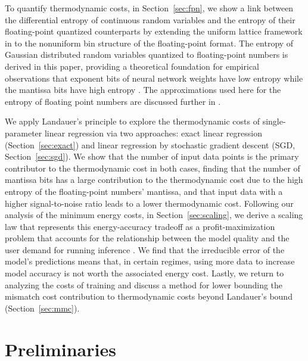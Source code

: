 \documentclass[12pt,onecolumn, margin=1in]{IEEEtran}
\begin{document}
To quantify thermodynamic costs, in Section~\ref{sec:fpn}, we show a link between the differential entropy of continuous random variables and the entropy of their floating-point quantized counterparts by extending the uniform lattice framework in \cite{kostina_data_2017} to the nonuniform bin structure of the floating-point format. 
The entropy of Gaussian distributed random variables quantized to floating-point numbers is derived in this paper, providing a theoretical foundation for empirical observations that exponent bits of neural network weights have low entropy while the mantissa bits have high entropy \cite{bordawekar2022efloatentropycodedfloatingpoint, hao_neuzip_2024}. The approximations used here for the entropy of floating point numbers are discussed further in \cite{daniels2026entropyfloatingpointnumbers}.



We apply Landauer's principle to explore the thermodynamic costs of single-parameter linear regression via two approaches: exact linear regression (Section~\ref{sec:exact}) and linear regression by stochastic gradient descent (SGD, Section~\ref{sec:sgd}). We show that the number of input data points is the primary contributor to the thermodynamic cost in both cases, finding that the number of mantissa bits has a large contribution to the thermodynamic cost due to the high entropy of the floating-point numbers' mantissa, and that input data with a higher signal-to-noise ratio leads to a lower thermodynamic cost. 
Following our analysis of the minimum energy costs, in Section~\ref{sec:scaling}, we derive a scaling law that represents this energy-accuracy tradeoff as a profit-maximization problem that accounts for the relationship between the model quality and the user demand for running inference \cite{sardana2025chinchillaoptimalaccountinginferencelanguage}. We find that the irreducible error of the model's predictions means that, in certain regimes, using more data to increase model accuracy is not worth the associated energy cost.
Lastly, we return to analyzing the costs of training and discuss a method for lower bounding the mismatch cost contribution to thermodynamic costs beyond Landauer's bound (Section~\ref{sec:mmc}).  

\section{Preliminaries}\label{sec:prelim}
\end{document}
